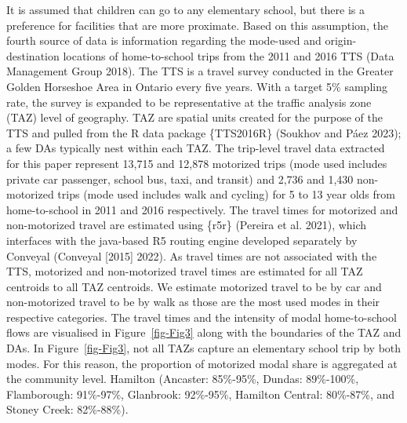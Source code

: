 \documentclass[
default
]{sn-jnl}
\begin{document}
It is assumed that children can go to any elementary school, but there
is a preference for facilities that are more proximate. Based on this
assumption, the fourth source of data is information regarding the
mode-used and origin-destination locations of home-to-school trips from
the 2011 and 2016 TTS (Data Management Group 2018). The TTS is a travel
survey conducted in the Greater Golden Horseshoe Area in Ontario every
five years. With a target 5\% sampling rate, the survey is expanded to
be representative at the traffic analysis zone (TAZ) level of geography.
TAZ are spatial units created for the purpose of the TTS and pulled from
the R data package \{TTS2016R\} (Soukhov and Páez 2023); a few DAs
typically nest within each TAZ. The trip-level travel data extracted for
this paper represent 13,715 and 12,878 motorized trips (mode used
includes private car passenger, school bus, taxi, and transit) and 2,736
and 1,430 non-motorized trips (mode used includes walk and cycling) for
5 to 13 year olds from home-to-school in 2011 and 2016 respectively. The
travel times for motorized and non-motorized travel are estimated using
\{r5r\} (Pereira et al. 2021), which interfaces with the java-based R5
routing engine developed separately by Conveyal (Conveyal {[}2015{]}
2022). As travel times are not associated with the TTS, motorized and
non-motorized travel times are estimated for all TAZ centroids to all
TAZ centroids. We estimate motorized travel to be by car and
non-motorized travel to be by walk as those are the most used modes in
their respective categories. The travel times and the intensity of modal
home-to-school flows are visualised in Figure~\ref{fig-Fig3} along with
the boundaries of the TAZ and DAs. In Figure~\ref{fig-Fig3}, not all
TAZs capture an elementary school trip by both modes. For this reason,
the proportion of motorized modal share is aggregated at the community
level. Hamilton (Ancaster: 85\%-95\%, Dundas: 89\%-100\%, Flamborough:
91\%-97\%, Glanbrook: 92\%-95\%, Hamilton Central: 80\%-87\%, and Stoney
Creek: 82\%-88\%).
\end{document}
